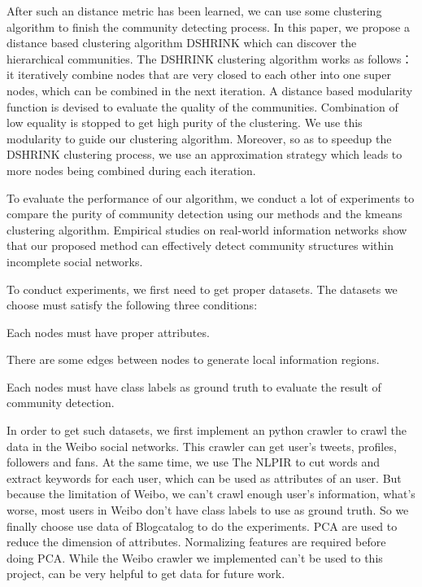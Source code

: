 After such an distance metric has been learned, we can 
use some clustering algorithm to finish the community detecting process. 
In this paper, we propose a distance based clustering algorithm DSHRINK which can discover
the hierarchical communities. The DSHRINK clustering algorithm works as follows：
it iteratively combine nodes that are very closed to each other into one super nodes,
which can be combined in the next iteration. A distance based modularity function is devised
to evaluate the quality of the communities. Combination of low equality is stopped to 
get high purity of the clustering. We use this modularity to guide our clustering algorithm.
Moreover, so as to speedup the DSHRINK clustering process, we use an approximation strategy 
which leads to more nodes being combined during each iteration.

To evaluate the performance of our algorithm, we conduct a lot of experiments to compare
the purity of community detection using our methods and the kmeans clustering algorithm.
Empirical studies on real-world information networks show that our proposed
method can effectively detect community structures within incomplete social networks.

To conduct experiments, we first need to get proper datasets.
The datasets we choose must satisfy the following three conditions:
\begin{inparaenum}[i)]
    \item Each nodes must have proper attributes.
    \item There are some edges between nodes to generate local information regions.
    \item Each nodes must have class labels as ground truth to evaluate the result of community detection.
\end{inparaenum}
In order to get such datasets, we first implement an python crawler to 
crawl the data in the Weibo social networks. This crawler can get user's 
tweets, profiles, followers and fans. At the same time, we use The NLPIR to cut words
and extract keywords for each user, which can be used as attributes of an user.
But because the limitation of Weibo, we can't crawl enough user's information,
what's worse, most users in Weibo don't have class labels to use as ground truth.   
So we finally choose use data of Blogcatalog to do the experiments. 
PCA are used to reduce the dimension of attributes. Normalizing features
are required before doing PCA.
While the Weibo crawler we implemented can't be used to this project,
can be very helpful to get data for future work.

